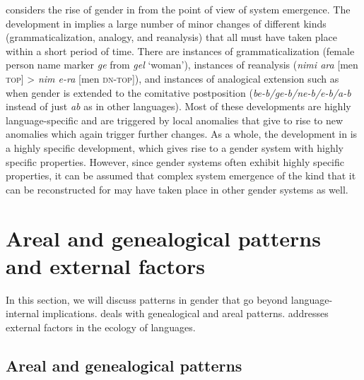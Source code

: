 \documentclass[output=collectionpaper]{langsci/langscibook}
\begin{document}
\cite{Waelchli2018} considers the rise of gender in  from the point of view of system emergence. The development in  implies a large number of minor changes of different kinds (grammaticalization, analogy, and reanalysis) that all must have taken place within a short period of time. There are instances of grammaticalization (female person name marker \textit{ge} from \textit{gel} `woman'), instances of reanalysis (\textit{nimi ara} [men \textsc{top}] > \textit{nim e-ra} [men \textsc{dn-top}]), and instances of analogical extension such as when gender is extended to the comitative postposition (\textit{be-b/ge-b/ne-b/e-b/a-b} instead of just \textit{ab} as in other  languages). Most of these developments are highly language-specific and are triggered by local anomalies that give to rise to new anomalies which again trigger further changes. As a whole, the development in  is a highly specific development, which gives rise to a gender system with highly specific properties. However, since gender systems often exhibit highly specific properties, it can be assumed that complex system emergence of the kind that it can be reconstructed for  may have taken place in other gender systems as well.

\section{Areal and genealogical patterns and external factors}
\label{sec:WDG:11}
\largerpage

In this section, we will discuss patterns in gender that go beyond language-internal implications.  deals with genealogical and areal patterns.  addresses external factors in the ecology of languages.

  \subsection{Areal and genealogical patterns}
  \label{sec:WDG:11.1}
\end{document}
